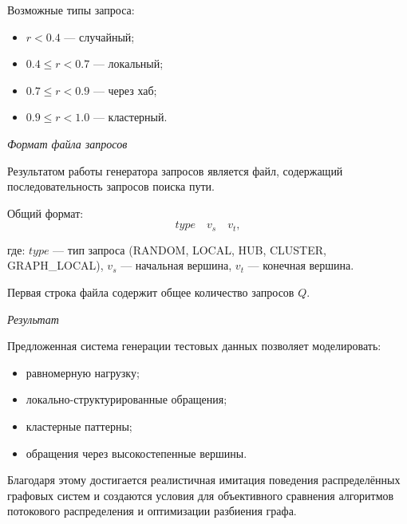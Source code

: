 Возможные типы запроса:
\begin{itemize}
    \item $r < 0.4$ --- случайный;
    \item $0.4 \le r < 0.7$ --- локальный;
    \item $0.7 \le r < 0.9$ --- через хаб;
    \item $0.9 \le r < 1.0$ --- кластерный.
\end{itemize}

\textit{Формат файла запросов}

Результатом работы генератора запросов является файл, содержащий последовательность запросов поиска пути.

Общий формат:
\begin{equation*}
    type \quad v_s \quad v_t, 
\end{equation*}

где: $type$ --- тип запроса (RANDOM, LOCAL, HUB, CLUSTER, GRAPH\_LOCAL), $v_s$ --- начальная вершина, $v_t$ --- конечная вершина.

Первая строка файла содержит общее количество запросов $Q$.

\textit{Результат}

Предложенная система генерации тестовых данных позволяет моделировать:
\begin{itemize}
    \item равномерную нагрузку;
    \item локально-структурированные обращения;
    \item кластерные паттерны;
    \item обращения через высокостепенные вершины.
\end{itemize}

Благодаря этому достигается реалистичная имитация поведения распределённых графовых систем и создаются условия для объективного сравнения алгоритмов потокового распределения и оптимизации разбиения графа.
